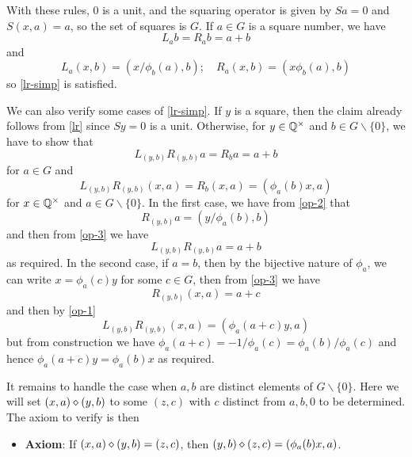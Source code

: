 With these rules, $0$ is a unit, and the squaring operator is given by $Sa = 0$ and $S(x,a) = a$, so the set of squares is $G$.  If $a \in G$ is a square number, we have
$$ L_a b = R_a b = a+b$$
and
$$ L_a (x,b) = (x/\phi_b(a), b); \quad R_a (x,b) = (x \phi_b(a), b)$$
so \eqref{lr-simp} is satisfied.

We can also verify some cases of \eqref{lr-simp}.  If $y$ is a square, then the claim already follows from \eqref{lr} since $Sy=0$ is a unit.  Otherwise, for $y \in \mathbb{Q}^\times$ and $b \in G \backslash \{0\}$, we have to show that
$$ L_{(y,b)} R_{(y,b)} a = R_b a = a+b$$
for $a \in G$ and
$$ L_{(y,b)} R_{(y,b)} (x,a) = R_b (x,a) = (\phi_a(b) x, a) $$
for $x \in \mathbb{Q}^\times$ and $a \in G \backslash \{0\}$.  In the first case, we have from \eqref{op-2} that
$$ R_{(y,b)} a = (y/\phi_a(b), b)$$
and then from \eqref{op-3} we have
$$L_{(y,b)} R_{(y,b)} a = a+b$$
as required.  In the second case, if $a=b$, then by the bijective nature of $\phi_a$, we can write $x = \phi_a(c) y$ for some $c \in G$, then from \eqref{op-3} we have
$$ R_{(y,b)} (x,a) = a+c$$
and then by \eqref{op-1}
$$ L_{(y,b)} R_{(y,b)} (x,a) = (\phi_a(a+c) y, a)$$
but from construction we have $\phi_a(a+c)=-1/\phi_a(c) = \phi_a(b)/\phi_a(c)$ and hence $\phi_a(a+c) y = \phi_a(b) x$ as required.

It remains to handle the case when $a,b$ are distinct elements of $G \backslash \{0\}$.  Here we will set $(x,a) \diamond (y,b)$ to some $(z,c)$ with $c$ distinct from $a,b,0$ to be determined.  The axiom to verify is then
\begin{itemize}
\item {\bf Axiom}: If $(x,a) \diamond (y,b) = (z,c)$, then $(y,b) \diamond (z,c) = (\phi_a(b) x,a)$.
\end{itemize}

